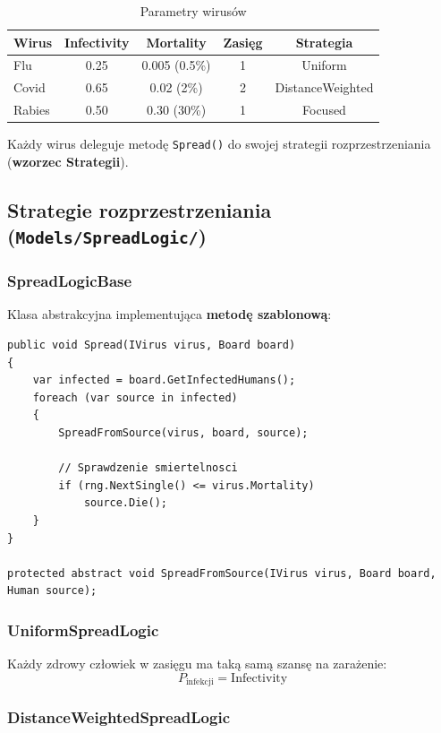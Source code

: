 \documentclass[a4paper,12pt]{article}
\begin{document}
\begin{table}[H]
\centering
\begin{tabular}{|l|c|c|c|c|}
\hline
\textbf{Wirus} & \textbf{Infectivity} & \textbf{Mortality} & \textbf{Zasięg} & \textbf{Strategia} \\ \hline
Flu    & 0.25 & 0.005 (0.5\%)  & 1 & Uniform \\
Covid  & 0.65 & 0.02 (2\%)     & 2 & DistanceWeighted \\
Rabies & 0.50 & 0.30 (30\%)    & 1 & Focused \\ \hline
\end{tabular}
\caption{Parametry wirusów}
\end{table}

Każdy wirus deleguje metodę \texttt{Spread()} do swojej strategii rozprzestrzeniania
(\textbf{wzorzec Strategii}).

\subsection{Strategie rozprzestrzeniania (\texttt{Models/SpreadLogic/})}

\subsubsection{SpreadLogicBase}

Klasa abstrakcyjna implementująca \textbf{metodę szablonową}:

\begin{lstlisting}[language={[Sharp]C}]
public void Spread(IVirus virus, Board board)
{
    var infected = board.GetInfectedHumans();
    foreach (var source in infected)
    {
        SpreadFromSource(virus, board, source);

        // Sprawdzenie smiertelnosci
        if (rng.NextSingle() <= virus.Mortality)
            source.Die();
    }
}

protected abstract void SpreadFromSource(IVirus virus, Board board, Human source);
\end{lstlisting}

\subsubsection{UniformSpreadLogic}

Każdy zdrowy człowiek w zasięgu ma taką samą szansę na zarażenie:
\[
P_{\text{infekcji}} = \text{Infectivity}
\]

\subsubsection{DistanceWeightedSpreadLogic}
\end{document}

